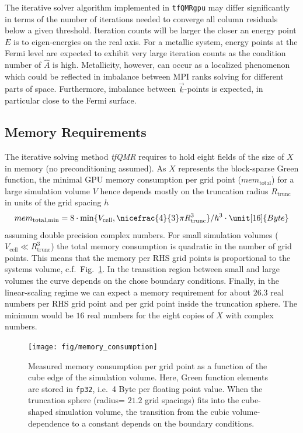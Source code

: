 \documentclass[oribibl]{llncs}
\newcommand{\um}[1]{_{\mathrm{#1}}}
\newcommand{\ttt}[1]{\texttt{#1}}
\begin{document}
\noindent
The iterative solver algorithm implemented in \ttt{tfQMRgpu} may differ significantly in terms of the number of iterations needed to converge all column residuals below a given threshold. Iteration counts will be larger the closer an energy point $E$ is to eigen-energies on the real axis. For a metallic system, energy points at the Fermi level are expected to exhibit very large iteration counts as the condition number of $\hat A$ is high. Metallicity, however, can occur as a localized phenomenon which could be reflected in imbalance between \ac{MPI} ranks solving for different parts of space.
Furthermore, imbalance between $\vec k$-points is expected, in particular close to the Fermi surface.


\subsection{Memory Requirements}
%
The iterative solving method \emph{tfQMR} requires to hold eight fields of the size of $X$ in memory (no preconditioning assumed).
As $X$ represents the block-sparse Green function, the minimal \ac{GPU} memory consumption per grid point ($mem\um{total}$) for a large simulation volume $V$ hence depends mostly on the truncation radius $R\um{trunc}$ in units of the grid spacing $h$
\begin{equation} 
	mem\um{total,min} = 8 \cdot \min\{V\um{cell}, \nicefrac{4}{3} \pi R^3\um{trunc} \}/h^3 \cdot \unit[16]{Byte} 	
	\label{eqn:memory}
\end{equation}
assuming double precision complex numbers.
For small simulation volumes ($V\um{cell} \ll R\um{trunc}^3$) the total memory consumption is quadratic in the number of grid points. This means that the memory per \ac{RHS} grid points is proportional to the systems volume, c.f.~Fig.~\ref{fig:memory-consumption}. In the transition region between small and large volumes the curve depends on the chose boundary conditions.
Finally, in the linear-scaling regime we can expect a memory requirement for about $26.3$ real numbers per \ac{RHS} grid point and per grid point inside the truncation sphere. The minimum would be $16$ real numbers for the eight copies of $X$ with complex numbers.

\begin{figure}[t]
	\centering
	\texttt{[image: fig/memory\_consumption]}
	\label{fig:memory-consumption}
	\caption{Measured memory consumption per grid point as a function of the cube edge of the simulation volume.
	Here, Green function elements are stored in \ttt{fp32}, i.e.~4 Byte per floating point value.
	When the truncation sphere (radius= $21.2$ grid spacings) fits into the cube-shaped simulation volume, 
	the transition from the cubic volume-dependence to a constant depends on the boundary conditions.}
\end{figure}
\end{document}
